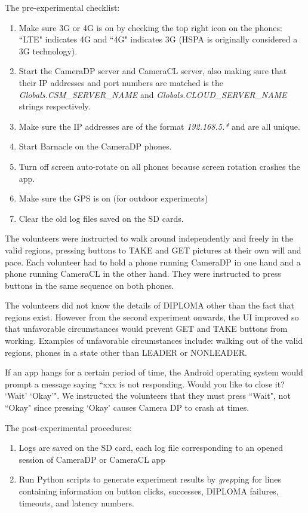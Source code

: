 The pre-experimental checklist:
\begin{enumerate}
\item
Make sure 3G or 4G is on by checking the top right icon on the phones: \textquotedblleft LTE" indicates 4G and \textquotedblleft 4G" indicates 3G (HSPA is originally considered a 3G technology).
\item
Start the CameraDP server and CameraCL server, also making sure that their IP addresses and port numbers are matched is the {\it Globals.CSM\_SERVER\_NAME} and {\it Globals.CLOUD\_SERVER\_NAME} strings respectively.
\item
Make sure the IP addresses are of the format {\it 192.168.5.*} and are all unique.
\item
Start Barnacle on the CameraDP phones.
\item
Turn off screen auto-rotate on all phones because screen rotation crashes the app.
\item
Make sure the GPS is on (for outdoor experiments)
\item
Clear the old log files saved on the SD cards.
\end{enumerate}

The volunteers were instructed to walk around independently and freely in the valid regions, pressing buttons to TAKE and GET pictures at their own will and pace. Each volunteer had to hold a phone running CameraDP in one hand and a phone running CameraCL in the other hand. They were instructed to press buttons in the same sequence on both phones.

The volunteers did not know the details of DIPLOMA other than the fact that regions exist. However from the second experiment onwards, the UI improved so that unfavorable circumstances would prevent GET and TAKE buttons from working. Examples of unfavorable circumstances include: walking out of the valid regions, phones in a state other than LEADER or NONLEADER.

If an app hangs for a certain period of time, the Android operating system would prompt a message saying \textquotedblleft xxx is not responding. Would you like to close it? `Wait' `Okay'". We instructed the volunteers that they must press ``Wait", not \textquotedblleft Okay" since pressing `Okay' causes Camera DP to crash at times.

The post-experimental procedures:
\begin{enumerate}
\item
Logs are saved on the SD card, each log file corresponding to an opened session of CameraDP or CameraCL app
\item
Run Python scripts to generate experiment results by {\it grep}ping for lines containing information on button clicks, successes, DIPLOMA failures, timeouts, and latency numbers.
\end{enumerate}

